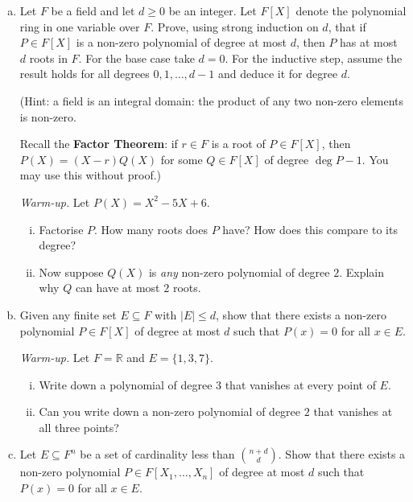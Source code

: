 \documentclass[12pt]{article}
\begin{document}
\begin{enumerate}[(a)]

  \item Let $F$ be a field and let $d \geq 0$ be an integer. Let $F[X]$
  denote the polynomial ring in one variable over $F$.
  Prove, using strong induction on $d$, that if $P \in F[X]$ is a
  non-zero polynomial of degree at most $d$, then $P$ has at most $d$
  roots in $F$.
  For the base case take $d = 0$.
  For the inductive step, assume the result holds for all degrees
  $0, 1, \ldots, d-1$ and deduce it for degree $d$.

  \medskip
  \noindent(Hint: a field is an integral domain: the product of any two
  non-zero elements is non-zero.

  \medskip
  \noindent Recall the \textbf{Factor Theorem}: if $r \in F$ is a root
  of $P \in F[X]$, then $P(X) = (X - r)Q(X)$ for some $Q \in F[X]$
  of degree $\deg P - 1$.  You may use this without proof.)

  \medskip
  \noindent\textit{Warm-up.} Let $P(X) = X^2 - 5X + 6$.
  \begin{enumerate}[(i)]
    \item Factorise $P$. How many roots does $P$ have? How does this compare to its degree?
    \item Now suppose $Q(X)$ is \emph{any} non-zero polynomial of degree
    $2$. Explain why $Q$ can have at most $2$ roots.
  \end{enumerate}

  \item Given any finite set $E \subseteq F$ with $|E| \leq d$, show
  that there exists a non-zero polynomial $P \in F[X]$ of degree at
  most $d$ such that $P(x) = 0$ for all $x \in E$.

  \medskip
  \noindent\textit{Warm-up.} Let $F = \mathbb{R}$ and $E = \{1, 3, 7\}$.
  \begin{enumerate}[(i)]
    \item Write down a polynomial of degree $3$ that vanishes at every point of $E$.
    \item Can you write down a non-zero polynomial of degree $2$ that
    vanishes at all three points?
  \end{enumerate}

  \item Let $E \subseteq F^n$ be a set of cardinality less than $\binom{n+d}{d}$.
  Show that there exists a non-zero polynomial
  $P \in F[X_1, \ldots, X_n]$ of degree at most $d$ such that $P(x) = 0$
  for all $x \in E$.


\end{enumerate}
\end{document}
